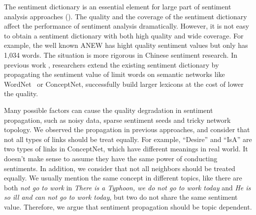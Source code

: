 The sentiment dictionary is an essential element for large part of sentiment analysis approaches (\cite{Taboada:lexiconBased11, Rao:WWW14, Wen:AAAI14, Lee:IJCNLP2011}). The quality and the coverage of the sentiment dictionary affect the performance of sentiment analysis dramatically. However, it is not easy to obtain a sentiment dictionary with both high quality and wide coverage. For example, the well known ANEW \cite{Bradley:ANEW99} has hight quality sentiment values but only has 1,034 words. The situation is more rigorous in Chinese sentiment research. In previous work \cite{Strapparava:IREC04, Esuli:LREC06, Liu:IUI03, Cambria:AAAI10, Wu:TAAI11, Tsai:IEEE13, Wu:relSelect14}, researchers extend the existing sentiment dictionary by propagating the sentiment value of limit words on semantic networks like WordNet~\cite{Miller:WordNet95} or ConceptNet\cite{Havasi:RANLP07,Speer:LREC12}, successfully build larger lexicons at the cost of lower the quality. 

Many possible factors can cause the quality degradation in sentiment propagation, such as noisy data, sparse sentiment seeds \cite{Wu:relSelect14} and tricky network topology. We observed the propagation in previous approaches, and consider that not all types of links should be treat equally. For example, ``Desire'' and ``IsA'' are two types of links in ConceptNet, which have different meanings in real world. It doesn't make sense to assume they have the same power of conducting sentiments. In addition, we consider that not all neighbors should be treated equally. We usually mention the same concept in different topics, like there are both \textit{not go to work} in \textit{There is a Typhoon, we do not go to work today} and \textit{He is so ill and can not go to work today}, but two do not share the same sentiment value. Therefore, we argue that sentiment propagation should be topic dependent.


